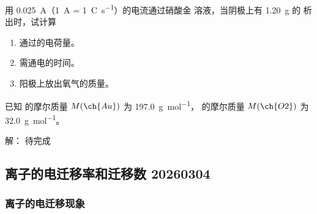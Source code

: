 \begin{example}
    用 \qty{0.025}{\ampere}（\qty{1}{\ampere} = \qty{1}{\coulomb\per\second}）的电流通过硝酸金 \ch{[Au(NO3)3]} 溶液，当阴极上有 \qty{1.20}{\gram} 的  析出时，试计算

    \begin{enumerate}[label=(\arabic*)]
        \item 通过的电荷量。
        \item 需通电的时间。
        \item 阳极上放出氧气的质量。
    \end{enumerate}

    已知  的摩尔质量 $M(\ch{Au})$ 为 \qty{197.0}{\gram\per\mol}， 的摩尔质量 $M(\ch{O2})$ 为 \qty{32.0}{\gram\per\mol}。

    {\heiti 解：} 
    待完成
\end{example}

\subsection{离子的电迁移率和迁移数 20260304}

\subsubsection{离子的电迁移现象}

